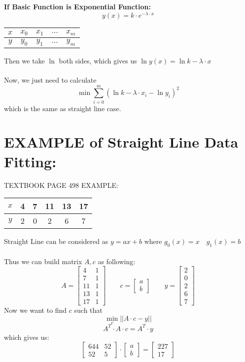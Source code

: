 \documentclass [9 pt]{article}
\theoremstyle{definition}
\begin{document}
\newpage
\textbf{If Basic Function is Exponential Function:}
$$y(x) = k \cdot e^{-\lambda\cdot x} $$
\begin{center}
\begin{tabular}{ c|c c c c } 
	$x$ & $x_0$ & $x_1$ & $\ldots$ & $x_m$\\
	\hline
	$y$ & $y_0$ & $y_1$ & $\ldots$ & $y_m$ 
\end{tabular}
\end{center}

Then we take $\ln$ both sides, which gives us $\ln y(x) = \ln k - \lambda \cdot x$\\
\\
Now, we just need to calculate
$$ \min \sum_{i = 0}^m (\ln k - \lambda \cdot x_i - \ln y_i )^2 $$
which is the same as straight line case.


\section*{EXAMPLE of Straight Line Data Fitting:}
TEXTBOOK PAGE 498 EXAMPLE:\\
\begin{center}
\begin{tabular}{ c|c c c c c } 
	$x$ & 4 & 7 & 11 & 13 & 17\\
	\hline
	$y$ & 2 & 0 & 2 & 6 & 7
\end{tabular}
\end{center}


\begin{mdframed}
	Straight Line can be considered as $y = ax + b$ where $g_0(x) = x\quad g_1(x) = b$\\
	\\
	Thus we can build matrix $A, c$ as following:
	$$A = \begin{bmatrix}
		4 & 1\\
		7 & 1\\
		11 & 1\\
		13 & 1\\
		17 & 1
	\end{bmatrix} \quad \quad 
	c = 
	\begin{bmatrix}
		a \\
		b
	\end{bmatrix}\quad\quad y = \begin{bmatrix}
		2\\
		0\\
		2\\
		6\\
		7
	\end{bmatrix}$$
	Now we want to find $c$ such that 
	$$ \min_{c} ||A\cdot c - y|| $$
	$$A^T \cdot A \cdot c = A^T \cdot y$$
	which gives us:
	$$\begin{bmatrix}
644 & 52 \\
52 & 5
\end{bmatrix} \cdot \begin{bmatrix}
	a\\
	b
\end{bmatrix}
 = 
 \begin{bmatrix}
 	227 \\
 	17
 \end{bmatrix}$$
\end{mdframed}
\end{document}
